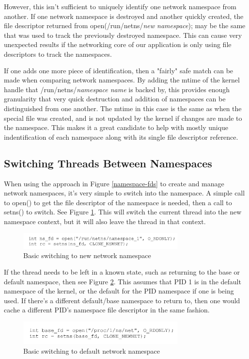 \documentclass[letterpaper]{article}
\begin{document}
However, this isn't sufficient to uniquely identify one network namespace from another. If one network namespace is destroyed and another quickly created, the file descriptor returned from open(/run/netns/\textit{new namespace}); may be the same that was used to track the previously destroyed namespace. This can cause very unexpected results if the networking core of our application is only using file descriptors to track the namespaces.

If one adds one more piece of identification, then a "fairly" safe match can be made when comparing network namespaces. By adding the mtime of the kernel handle that /run/netns/\textit{namespace name} is backed by, this provides enough granularity that very quick destruction and addition of namespaces can be distinguished from one another. The mtime in this case is the same as when the special file was created, and is not updated by the kernel if changes are made to the namespace. This makes it a great candidate to help with mostly unique indentification of each namespace along with its single file descriptor reference.

\subsection{Switching Threads Between Namespaces}
When using the approach in Figure \ref{namespace-fds} to create and manage network namespaces, it's very simple to switch into the namespace. A simple call to open() to get the file descriptor of the namespace is needed, then a call to setns() to switch. See Figure \ref{switch-new-namespace}. This will switch the current thread into the new namespace context, but it will also leave the thread in that context.
\begin{figure}[h]
\includegraphics[width=3.31in]{switch-new-namespace.png}
\caption{Basic switching to new network namespace}
\label{switch-new-namespace}
\end{figure}

If the thread needs to be left in a known state, such as returning to the base or default namespace, then see Figure \ref{switch-base-namespace}. This assumes that PID 1 is in the default namespace of the kernel, or the default for the PID namespace if one is being used. If there's a different default/base namespace to return to, then one would cache a different PID's namespace file descriptor in the same fashion.
\begin{figure}[h]
\includegraphics[width=3.31in]{switch-base-namespace.png}
\caption{Basic switching to default network namespace}
\label{switch-base-namespace}
\end{figure}
\end{document}
